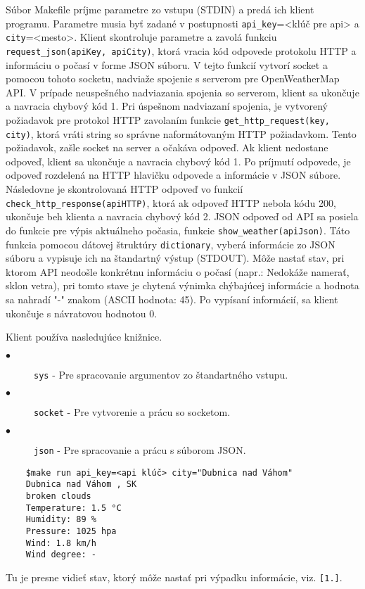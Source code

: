 \documentclass{homework}
\begin{document}
	\maketitle
	\setcounter{questionCounter}{0}
	\renewcommand{\questiontype}{Popis funkcionality}
	\question
		Súbor Makefile príjme parametre zo vstupu (STDIN) a predá ich klient programu. Parametre musia 		byť zadané v postupnosti \verb|api_key|=<klúč pre api> a \verb|city|=<mesto>. Klient skontroluje 				parametre a zavolá funkciu \verb|request_json(apiKey, apiCity)|, ktorá vracia kód odpovede protokolu HTTP a informáciu o počasí v forme JSON súboru. V tejto funkcií vytvorí socket a pomocou tohoto socketu, nadviaže spojenie s serverom pre 						OpenWeatherMap API. V prípade neuspešného nadviazania spojenia so serverom, klient sa ukončuje 		a navracia chybový kód 1. Pri úspešnom nadviazaní spojenia, je vytvorený požiadavok pre protokol HTTP zavolaním funkcie \verb|get_http_request(key, city)|, ktorá vráti string so správne naformátovaným HTTP požiadavkom. Tento požiadavok, zašle socket na server a očakáva odpoveď. Ak klient nedostane odpoveď, klient sa ukončuje a navracia chybový kód 1. Po príjmutí odpovede, je odpoveď rozdelená na HTTP hlavičku odpovede a informácie v JSON súbore. Následovne je skontrolovaná HTTP odpoveď vo funkcií \verb|check_http_response(apiHTTP)|, ktorá ak odpoveď HTTP nebola kódu 200, ukončuje beh klienta a navracia chybový kód 2. JSON odpoveď od API sa posiela do funkcie pre výpis aktuálneho počasia, funkcie \verb|show_weather(apiJson)|. Táto funkcia pomocou dátovej štruktúry \verb|dictionary|, vyberá informácie zo JSON súboru a vypisuje ich na štandartný výstup (STDOUT). Môže nastať stav, pri ktorom API neodošle konkrétnu informáciu o počasí (napr.: Nedokáže namerať, sklon vetra), pri tomto stave je chytená výnimka chýbajúcej informácie a hodnota sa nahradí "-" znakom (ASCII hodnota: 45). Po vypísaní informácií, sa klient ukončuje s návratovou hodnotou 0.
	
	\renewcommand{\questiontype}{Použité knižnice}
	\question
	Klient používa nasledujúce knižnice.	
	
	\begin{description}
  		\item[$\bullet$] \verb|sys| - Pre spracovanie argumentov zo štandartného vstupu.
  		\item[$\bullet$] \verb|socket| - Pre vytvorenie a prácu so socketom.
  		\item[$\bullet$] \verb|json| - Pre spracovanie a prácu s súborom JSON.
	\end{description}	
	
	\renewcommand{\questiontype}{Príklady spustenia}
	\question
	\begin{verbatim}
	$make run api_key=<api klúč> city="Dubnica nad Váhom"
	Dubnica nad Váhom , SK
	broken clouds
	Temperature: 1.5 °C
	Humidity: 89 %
	Pressure: 1025 hpa
	Wind: 1.8 km/h
	Wind degree: - 
	\end{verbatim}	
	Tu je presne vidieť stav, ktorý môže nastať pri výpadku informácie, viz. \verb|[1.]|.
\end{document}
